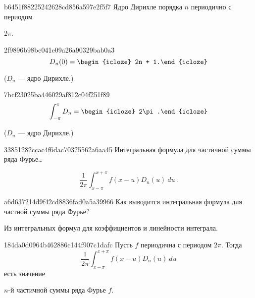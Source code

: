\begin{note}{b6451f88225242628cd856a597e2f5f7}
    Ядро Дирихле порядка \({ n }\) периодично с периодом \begin{icloze}{1}\({ 2\pi }\).\end{icloze}
\end{note}

\begin{note}{2f9896b98be041e09a26a90329bab0a3}
    \[
        D_n(0) = \begin{icloze}{1}2n + 1.\end{icloze}
    \]

    \begin{center}
        \tiny
        (\({ D_n }\) --- ядро Дирихле.)
    \end{center}
\end{note}

\begin{note}{7bcf23025ba446029af812c04f251f89}
    \[
        \int_{-\pi}^{\pi} D_n = \begin{icloze}{1}2\pi.\end{icloze}
    \]

    \begin{center}
        \tiny
        (\({ D_n }\) --- ядро Дирихле.)
    \end{center}
\end{note}

\begin{note}{33851282ccac4f6dac70325562a6aa45}
    Интегральная формула для частичной суммы ряда Фурье\ldots

    \begin{cloze}{1}
        \[
            \frac{1}{2\pi} \int_{x-\pi}^{x+\pi} f(x-u) D_{n}(u)\: du\,.
        \]
    \end{cloze}
\end{note}

\begin{note}{a6d637214d9f42cd8836fad0a5a39966}
    Как выводится интегральная формула для частной суммы ряда Фурье?

    \begin{cloze}{1}
        Из интегральных формул для коэффициентов и линейности интеграла.
    \end{cloze}
\end{note}

\begin{note}{184da0d0964b462886c144f907c1dafc}
    Пусть \({ f }\) периодична с периодом \({ 2\pi }\).
    Тогда
    \[
        \frac{1}{2\pi} \int_{x - \pi}^{x + \pi} f(x - u) D_n(u)\: du
    \]
    есть значение \begin{icloze}{1}\({ n }\)-й частичной суммы ряда Фурье \({ f }\).\end{icloze}
\end{note}

